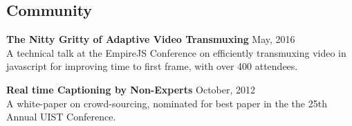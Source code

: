 \documentclass[oneside, final]{scrartcl}
\begin{document}
\begin{center}
\begin{comment}
    \textsc{Research Fellowship with Xerox\hfill Rochester, NY\\}
    \textsc{University of Rochester HCI Lab \hfill June 2011 - May 2012\\}
    \textsc{Research Fellowship with Xerox\hfill Rochester, NY\\}
    \begin{itemize}
      \setlength{\itemsep}{1pt}
      \setlength{\parskip}{0pt}
      \setlength{\parsep}{0pt}
      \setlength{\leftmargin}{-5mm}
          \item Researched crowd-sourced real-time audio transcription for hearing-impaired internet users.
          \item Developed a management applicaton for Amazon Mechanical Turk which allowed faster iteration on experiments.
          \item Awarded Xerox Fellowship for contributions to real-time processing of crowd inputs.
          \item Participated in project planning, design, and development of services for gathering and retaining Amazon Mechanical Turk workers.
    \end{itemize}
\end{comment}


\section{Community}
\begin{flushleft}

    \textbf{The Nitty Gritty of Adaptive Video Transmuxing} \hfill May, 2016\\
    A technical talk at the EmpireJS Conference on efficiently transmuxing video in javascript for improving time to first frame, with over 400 attendees.

    \vspace{10pt}

    \textbf{Real time Captioning by Non-Experts} \hfill October, 2012\\
    A white-paper on crowd-sourcing, nominated for best paper in the the 25th Annual UIST Conference.




\end{flushleft}
\end{center}
\end{document}
